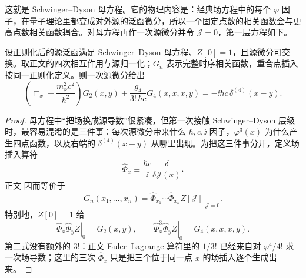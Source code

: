 这就是 Schwinger--Dyson 母方程。它的物理内容是：经典场方程中的每个 $\varphi$ 因子，在量子理论里都变成对外源的泛函微分，所以一个固定点数的相关函数会与更高点数相关函数耦合。对母方程再作一次源微分并令 $\mathcal J=0$，第一层方程如下。
\begin{proposition}[四次标量相互作用的相关函数层级]
设正则化后的源泛函满足 Schwinger--Dyson 母方程、$Z[0]=1$，且源微分可交换。取正文的四次相互作用与源归一化；$G_n$ 表示完整时序相关函数，重合点插入按同一正则化定义。则一次源微分给出
\begin{equation}
 {
 \left(\Box_x+\frac{m_\varphi^2c^2}{\hbar^2}\right)G_2(x,y)
 +\frac{g_4}{3!\,\hbar c}G_4(x,x,x,y)
 =-\ii\hbar c\,\delta^{(4)}(x-y).}
 \label{eq:SD-two-four-hierarchy-dp76}
\end{equation}
\end{proposition}
\begin{proof}
母方程中“把场换成源导数”很紧凑，但第一次接触 Schwinger--Dyson 层级时，最容易混淆的是三件事：每次源微分带来什么 $\hbar,c,\ii$ 因子，$\varphi^3(x)$ 为什么产生四点函数，以及右端的 $\delta^{(4)}(x-y)$ 从哪里出现。为把这三件事分开，定义场插入算符
\begin{equation*}
\widehat\Phi_x
\equiv\frac{\hbar c}{\ii}\frac{\delta}{\delta\mathcal J(x)}.
\end{equation*}
正文 因而等价于
\begin{equation*}
G_n(x_1,\ldots,x_n)
=\left.
\widehat\Phi_{x_1}\cdots\widehat\Phi_{x_n}Z[\mathcal J]
\right|_{\mathcal J=0}.
\end{equation*}
特别地，$Z[0]=1$ 给
\begin{equation*}
\left.\widehat\Phi_x\widehat\Phi_yZ\right|_0=G_2(x,y),
\qquad
\left.\widehat\Phi_x^3\widehat\Phi_yZ\right|_0=G_4(x,x,x,y).
\end{equation*}
第二式没有额外的 $3!$：正文 Euler--Lagrange 算符里的 $1/3!$ 已经来自对 $\varphi^4/4!$ 求一次场导数；这里的三次 $\widehat\Phi_x$ 只是把三个位于同一点 $x$ 的场插入逐个生成出来。


\end{proof}
